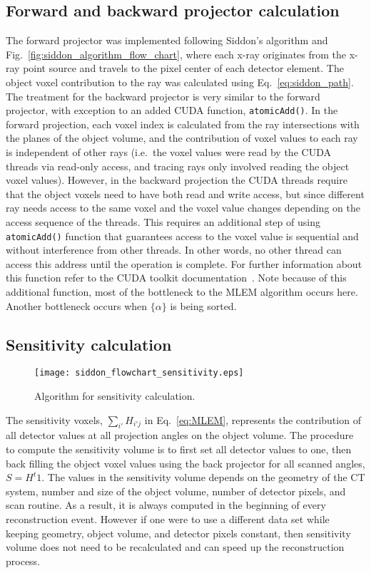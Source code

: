 \subsection{Forward and backward projector calculation}
The forward projector was implemented following Siddon's algorithm and Fig.~\ref{fig:siddon_algorithm_flow_chart}, where each x-ray originates from the x-ray point source and travels to the pixel center of each detector element.  The object voxel contribution to the ray was calculated using Eq.~\ref{eq:siddon_path}.  The treatment for the backward projector is very similar to the forward projector, with exception to an added CUDA function, \texttt{atomicAdd()}.  In the forward projection, each voxel index is calculated from the ray intersections with the planes of the object volume, and the contribution of voxel values to each ray is independent of other rays (i.e.\ the voxel values were read by the CUDA threads via read-only access, and tracing rays only involved reading the object voxel values).  However, in the backward projection the CUDA threads require that the object voxels need to have both read and write access, but since different ray needs access to the same voxel and the voxel value changes depending on the access sequence of the threads.  This requires an additional step of using \texttt{atomicAdd()} function that guarantees access to the voxel value is sequential and without interference from other threads.  In other words, no other thread can access this address until the operation is complete.  For further information about this function refer to the CUDA toolkit documentation~\citep{Cudatoolkit}.  Note because of this additional function, most of the bottleneck to the MLEM algorithm occurs here.  Another bottleneck occurs when $\{ \alpha \}$ is being sorted.

\subsection{Sensitivity calculation}

\begin{figure}[h]
\centering
\texttt{[image: siddon\_flowchart\_sensitivity.eps]}
\caption[Algorithm for sensitivity calculation.]{Algorithm for sensitivity calculation.}
\label{fig:sensitivityslices}
\end{figure}

The sensitivity voxels, $\sum\limits_{i'} H_{i'j}$ in Eq.~\ref{eq:MLEM}, represents the contribution of all detector values at all projection angles on the object volume.  The procedure to compute the sensitivity volume is to first set all detector values to one, then back filling the object voxel values using the back projector for all scanned angles, $S = H^t 1$.  The values in the sensitivity volume depends on the geometry of the CT system, number and size of the object volume, number of detector pixels, and scan routine.  As a result, it is always computed in the beginning of every reconstruction event.  However if one were to use a different data set while keeping geometry, object volume, and detector pixels constant, then sensitivity volume does not need to be recalculated and can speed up the reconstruction process.

